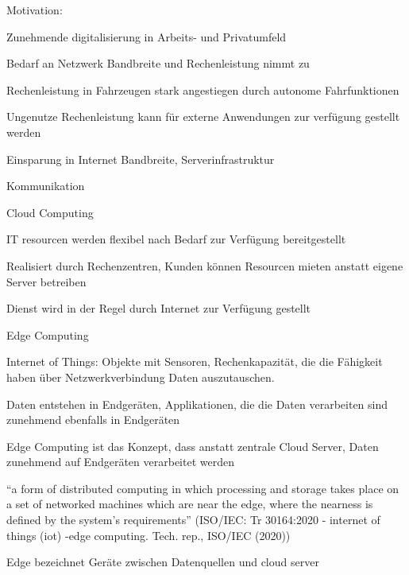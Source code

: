 \begin{notes}
\item Motivation:
    \begin{notes}
        \item Zunehmende digitalisierung in Arbeits- und Privatumfeld
        \item Bedarf an Netzwerk Bandbreite und Rechenleistung nimmt zu
        \item Rechenleistung in Fahrzeugen stark angestiegen durch autonome Fahrfunktionen
        \item Ungenutze Rechenleistung kann für externe Anwendungen zur verfügung gestellt werden
        \item Einsparung in Internet Bandbreite, Serverinfrastruktur
    \end{notes}
\item Kommunikation
    \begin{notes}
        \item Cloud Computing
        \begin{notes}
            \item IT resourcen werden flexibel nach Bedarf zur Verfügung bereitgestellt
            \item Realisiert durch Rechenzentren, Kunden können Resourcen mieten anstatt eigene Server betreiben
            \item Dienst wird in der Regel durch Internet zur Verfügung gestellt
        \end{notes}
        \item Edge Computing
        \begin{notes}
            \item Internet of Things: Objekte mit Sensoren, Rechenkapazität, die die Fähigkeit haben über Netzwerkverbindung Daten auszutauschen.
            \item Daten entstehen in Endgeräten, Applikationen, die die Daten verarbeiten sind zunehmend ebenfalls in Endgeräten
            \item Edge Computing ist das Konzept, dass anstatt zentrale Cloud Server, Daten zunehmend auf Endgeräten verarbeitet werden
            \item “a form of distributed computing in which processing and storage takes place on a set of networked machines which are near the edge, where the nearness is defined by the system’s requirements”  (ISO/IEC: Tr 30164:2020 - internet of things (iot) -edge computing. Tech. rep., ISO/IEC (2020))
            \item Edge bezeichnet Geräte zwischen Datenquellen und cloud server

\end{notes}
\end{notes}
\end{notes}
